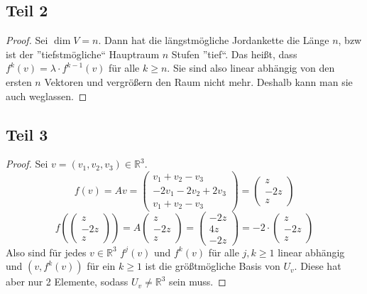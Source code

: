 \documentclass[10pt,a4paper]{article}
\begin{document}
\subsection*{Teil 2}

\begin{proof}
Sei $\dim V = n$.
Dann hat die längstmögliche Jordankette die Länge $n$, bzw ist der ''tiefstmögliche`` Hauptraum $n$ Stufen ''tief``.
Das heißt, dass $f^{k}(v) = \lambda \cdot f^{k - 1}(v)$ für alle $k \ge n$.
Sie sind also linear abhängig von den ersten $n$ Vektoren und vergrößern den Raum nicht mehr.
Deshalb kann man sie auch weglassen.
\end{proof}

\subsection*{Teil 3}

\begin{proof}
Sei $v = (v_{1}, v_{2}, v_{3}) \in \mathbb{R}^{3}$.
\begin{equation}
f(v) = Av = \begin{pmatrix}
v_{1} + v_{2} - v_{3}\\
-2v_{1} - 2v_{2} + 2v_{3}\\
v_{1} + v_{2} - v_{3}
\end{pmatrix}
= \begin{pmatrix}
z\\-2z\\z
\end{pmatrix}
\end{equation}
\begin{equation}
f(\begin{pmatrix}
z\\-2z\\z
\end{pmatrix}) = A\begin{pmatrix}
z\\-2z\\z
\end{pmatrix}
= \begin{pmatrix}
-2z\\4z\\-2z
\end{pmatrix}
= -2 \cdot \begin{pmatrix}
z\\-2z\\z
\end{pmatrix}
\end{equation}
Also sind für jedes $v \in \mathbb{R}^{3}$ $f^{j}(v)$ und $f^{k}(v)$ für alle $j, k \ge 1$ linear abhängig und $(v, f^{k}(v))$ für ein $k \ge 1$ ist die größtmögliche Basis von $U_{v}$.
Diese hat aber nur 2 Elemente, sodass $U_{v} \ne \mathbb{R}^{3}$ sein muss.
\end{proof}
\end{document}
